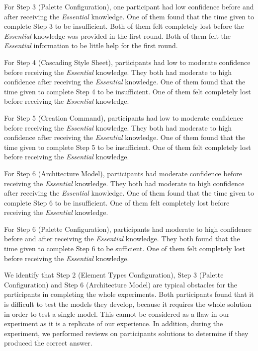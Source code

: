 For Step 3 (Palette Configuration), one participant had low confidence before and after receiving the \textit{Essential} knowledge. 
One of them found that the time given to complete Step 3 to be insufficient.
Both of them felt completely lost before the \textit{Essential} knowledge was provided in the first round.
Both of them felt the \textit{Essential} information to be little help for the first round.

For Step 4 (Cascading Style Sheet), participants had low to moderate confidence before receiving the \textit{Essential} knowledge. 
They both had moderate to high confidence after receiving the \textit{Essential} knowledge.
One of them found that the time given to complete Step 4 to be insufficient.
One of them felt completely lost before receiving the \textit{Essential} knowledge.

For Step 5 (Creation Command), participants had low to moderate confidence before receiving the \textit{Essential} knowledge. 
They both had moderate to high confidence after receiving the \textit{Essential} knowledge.
One of them found that the time given to complete Step 5 to be insufficient.
One of them felt completely lost before receiving the \textit{Essential} knowledge.

For Step 6 (Architecture Model), participants had moderate confidence before receiving the \textit{Essential} knowledge. 
They both had moderate to high confidence after receiving the \textit{Essential} knowledge.
One of them found that the time given to complete Step 6 to be insufficient.
One of them felt completely lost before receiving the \textit{Essential} knowledge.

For Step 6 (Palette Configuration), participants had moderate to high confidence before and after receiving the \textit{Essential} knowledge. 
They both found that the time given to complete Step 6 to be sufficient.
One of them felt completely lost before receiving the \textit{Essential} knowledge.


We identify that Step 2 (Element Types Configuration), Step 3 (Palette Configuration) and Step 6 (Architecture Model) are typical obstacles for the participants in completing the whole experiments. 
Both participants found that it is difficult to test the models they develop, because it requires the whole solution in order to test a single model.
This cannot be considered as a flaw in our experiment as it is a replicate of our experience.
In addition, during the experiment, we performed reviews on participants solutions to determine if they produced the correct answer.

